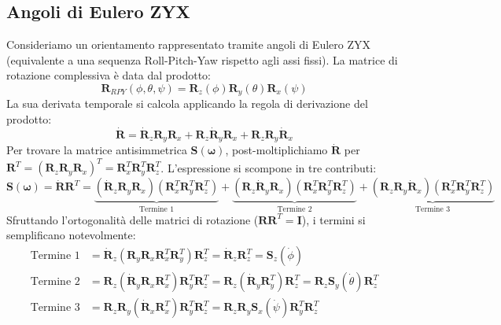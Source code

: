 \documentclass[11pt, a4paper]{report}
\begin{document}
\subsection{Angoli di Eulero ZYX}
Consideriamo un orientamento rappresentato tramite angoli di Eulero ZYX (equivalente a una sequenza Roll-Pitch-Yaw rispetto agli assi fissi). La matrice di rotazione complessiva è data dal prodotto:
\[
    \bm{R}_{RPY}(\phi, \theta, \psi) = \bm{R}_z(\phi)\bm{R}_y(\theta)\bm{R}_x(\psi)
\]
La sua derivata temporale si calcola applicando la regola di derivazione del prodotto:
\[
    \dot{\bm{R}} = \dot{\bm{R}}_z\bm{R}_y\bm{R}_x + \bm{R}_z\dot{\bm{R}}_y\bm{R}_x + \bm{R}_z\bm{R}_y\dot{\bm{R}}_x
\]
Per trovare la matrice antisimmetrica \(\bm{S}(\bm{\omega})\), post-moltiplichiamo \(\dot{\bm{R}}\) per \(\bm{R}^T = (\bm{R}_z\bm{R}_y\bm{R}_x)^T = \bm{R}_x^T\bm{R}_y^T\bm{R}_z^T\). L'espressione si scompone in tre contributi:
\[
    \bm{S}(\bm{\omega}) = \dot{\bm{R}}\bm{R}^T =
    \underbrace{(\dot{\bm{R}}_z\bm{R}_y\bm{R}_x)(\bm{R}_x^T\bm{R}_y^T\bm{R}_z^T)}_{\text{Termine 1}} +
    \underbrace{(\bm{R}_z\dot{\bm{R}}_y\bm{R}_x)(\bm{R}_x^T\bm{R}_y^T\bm{R}_z^T)}_{\text{Termine 2}} +
    \underbrace{(\bm{R}_z\bm{R}_y\dot{\bm{R}}_x)(\bm{R}_x^T\bm{R}_y^T\bm{R}_z^T)}_{\text{Termine 3}}
\]
Sfruttando l'ortogonalità delle matrici di rotazione (\(\bm{R}\bm{R}^T = \bm{I}\)), i termini si semplificano notevolmente:
\begin{align*}
    \text{Termine 1} &= \dot{\bm{R}}_z (\bm{R}_y\bm{R}_x\bm{R}_x^T\bm{R}_y^T) \bm{R}_z^T = \dot{\bm{R}}_z\bm{R}_z^T = \bm{S}_z(\dot{\phi}) \\
    \text{Termine 2} &= \bm{R}_z (\dot{\bm{R}}_y\bm{R}_x\bm{R}_x^T) \bm{R}_y^T\bm{R}_z^T = \bm{R}_z(\dot{\bm{R}}_y\bm{R}_y^T)\bm{R}_z^T = \bm{R}_z \bm{S}_y(\dot{\theta}) \bm{R}_z^T \\
    \text{Termine 3} &= \bm{R}_z\bm{R}_y(\dot{\bm{R}}_x\bm{R}_x^T)\bm{R}_y^T\bm{R}_z^T = \bm{R}_z\bm{R}_y \bm{S}_x(\dot{\psi}) \bm{R}_y^T\bm{R}_z^T
\end{align*}
\end{document}
